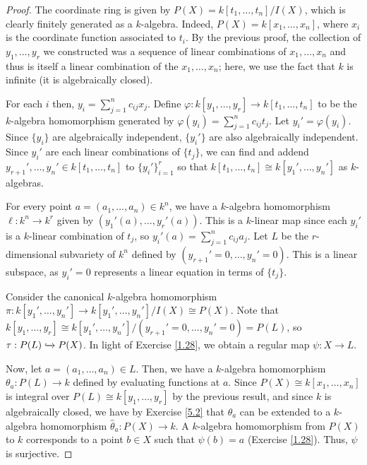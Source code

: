 \begin{proof}
The coordinate ring is given by $P(X) = k[t_1,\ldots,t_n]/I(X)$, which is clearly finitely generated as a $k$-algebra. Indeed, 
$P(X) = k[x_1,\ldots,x_n]$, where $x_i$ is the coordinate function associated to $t_i$. By the previous proof, the collection of 
$y_1, \ldots, y_r$ we constructed was a sequence of linear combinations of $x_1, \ldots, x_n$ and thus is itself a linear combination of 
the $x_1, \ldots, x_n$; here, we use the fact that $k$ is infinite (it is algebraically closed).

For each $i$ then, $y_i = \sum_{j=1}^n c_{ij} x_j$. Define $\varphi : k[y_1,\ldots,y_r] \to k[t_1,\ldots,t_n]$ to be the $k$-algebra homomorphism generated 
by $\varphi(y_i) = \sum_{j=1}^n c_{ij} t_j$. Let $y_i' = \varphi(y_i)$. Since $\{y_i\}$ are algebraically independent, $\{y_i'\}$ are also algebraically 
independent. Since $y_i'$ are each linear combinations of $\{t_j\}$, we can find and addend $y_{r+1}',\ldots,y_n' \in k[t_1,\ldots,t_n]$ to $\{y_i'\}_{i=1}^r$
so that $k[t_1,\ldots,t_n] \cong k[y_1',\ldots,y_n']$ as $k$-algebras. 

For every point $a = (a_1,\ldots,a_n) \in k^n$, we have a $k$-algebra homomorphism $\ell : k^n \to k^r$ given by $(y_1'(a),\ldots,y_r'(a))$. This is a $k$-linear
map since each $y_i'$ is a $k$-linear combination of $t_j$, so $y_i'(a) = \sum_{j=1}^n c_{ij} a_j$. Let $L$ be the $r$-dimensional subvariety of $k^n$ defined by 
$(y_{r+1}' = 0, \ldots, y_n' = 0)$. This is a linear subspace, as $y_i' = 0$ represents a linear equation in terms of $\{t_j\}$.

Consider the canonical $k$-algebra homomorphism $\pi : k[y_1',\ldots,y_n'] \to k[y_1',\ldots,y_n']/I(X) \cong P(X)$. Note that 
$k[y_1,\ldots,y_r] \cong k[y_1',\ldots,y_n']/(y_{r+1}' = 0,\ldots,y_n' = 0) = P(L)$, so $\tau : P(L) \xhookrightarrow{} P(X)$. 
In light of Exercise \ref{1.28}, we obtain a regular map $\psi : X \to L$.

Now, let $a = (a_1,\ldots,a_n) \in L$. Then, we have a $k$-algebra homomorphism $\theta_a : P(L) \to k$ defined by evaluating functions at $a$.
Since $P(X) \cong k[x_1,\ldots,x_n]$ is integral over $P(L) \cong k[y_1,\ldots,y_r]$ by the previous result, and since $k$ is algebraically closed, 
we have by Exercise \ref{5.2} that $\theta_a$ can be extended to a $k$-algebra homomorphism $\hat\theta_a : P(X) \to k$. A $k$-algebra homomorphism 
from $P(X)$ to $k$ corresponds to a point $b \in X$ such that $\psi(b) = a$ (Exercise \ref{1.28}). Thus, $\psi$ is surjective.
\end{proof}

